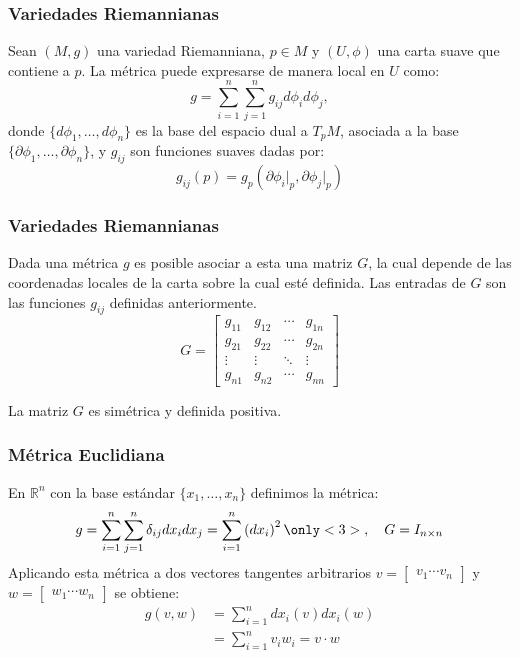 \begin{frame}
	\frametitle{Variedades Riemannianas}
	\begin{lemma}
		\label{Lemma: Expresión local de la métrica}
		Sean $(M,g)$ una variedad Riemanniana, $p \in M$ y $(U,\phi)$ una carta suave que contiene a $p$. La métrica puede expresarse de manera local en $U$ como:
		\[
			g = \sum_{i=1}^{n}\sum_{j=1}^{n} g_{ij} d\phi_i d\phi_j,
		\]
		donde $\{ d\phi_{1}, \ldots, d\phi_{n} \}$ es la base del espacio dual a $T_{p}M$, asociada a la base $\{ \partial \phi_{1}, \ldots, \partial \phi_{n} \}$, y $g_{ij}$ son funciones suaves dadas por:
		\[
			g_{ij}(p) = g_{p}\left( \partial \phi_{i} \big|_{p}, \partial \phi_j \big|_{p}\right)
		\]
	\end{lemma}
\end{frame}

\begin{frame}
	\frametitle{Variedades Riemannianas}
	Dada una métrica $g$ es posible asociar a esta una matriz $G$, la cual depende de las coordenadas locales de la carta sobre la cual esté definida. \pause Las entradas de $G$ son las funciones $g_{ij}$ definidas anteriormente.
	\[
		G = \begin{bmatrix}
			g_{11} & g_{12} & \cdots & g_{1n} \\
			g_{21} & g_{22} & \cdots & g_{2n} \\
			\vdots & \vdots & \ddots & \vdots \\
			g_{n1} & g_{n2} & \cdots & g_{nn}
		\end{bmatrix}
	\]\pause

	\vspace{12pt}

	La matriz $G$ es simétrica y definida positiva.
\end{frame}


\begin{frame}
	\frametitle{Métrica Euclidiana}\pause
	\begin{example}
		En $\mathbb{R}^{n}$ con la base estándar $\{x_{1}, \ldots, x_{n}\}$ definimos la métrica:
		\[
			g = \sum_{i=1}^{n} \sum_{j=1}^{n} \delta_{ij} dx_{i} dx_{j} = \sum_{i=1}^{n} \left(dx_{i}\right)^{2}
			\only<3>{, \quad G = I_{n \times n}}
		\] \pause \pause
		Aplicando esta métrica a dos vectores tangentes arbitrarios $v = \begin{bmatrix} v_1 \cdots v_n \end{bmatrix}$ y $w = \begin{bmatrix} w_1 \cdots w_n \end{bmatrix}$ se obtiene:
		\begin{align*}
			g(v,w) & = \sum_{i=1}^{n} dx_{i}(v) dx_{i}(w)   \\
			       & = \sum_{i=1}^{n}v_{i}w_{i} = v \cdot w
		\end{align*}
	\end{example}
\end{frame}

